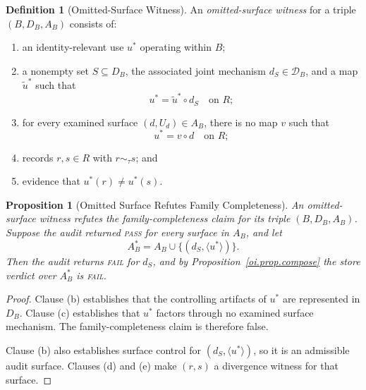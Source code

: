 \documentclass[11pt]{article}
\theoremstyle{plain}
\newtheorem{proposition}[theorem]{Proposition}
\theoremstyle{definition}
\newtheorem{definition}[theorem]{Definition}
\theoremstyle{remark}
\newcommand{\PASS}{\textnormal{\textsc{pass}}}
\newcommand{\FAIL}{\textnormal{\textsc{fail}}}
\begin{document}
\begin{definition}[Omitted-Surface Witness]
  \label{oi.def.omittedsurface}
  An \emph{omitted-surface witness}
  for a triple \((B,D_B,A_B)\)
  consists of:
  \begin{enumerate}[label=(\alph*)]
    \item an identity-relevant use \(u^{\ast}\) operating within \(B\);
    \item a nonempty set \(S\subseteq D_B\),
          the associated joint mechanism
          \(d_S\in\mathcal{D}_B\),
          and a map \(\tilde{u}^{\ast}\) such that
          \[
            u^{\ast}
            =
            \tilde{u}^{\ast}\circ d_S
            \quad\text{on }R;
          \]
    \item for every examined surface
          \((d,U_d)\in A_B\),
          there is no map \(v\) such that
          \[
            u^{\ast}=v\circ d
            \quad\text{on }R;
          \]
    \item records \(r,s\in R\) with
          \(r\sim_{\tau}s\); and
    \item evidence that
          \(u^{\ast}(r)\neq u^{\ast}(s)\).
  \end{enumerate}
\end{definition}

\begin{proposition}[Omitted Surface Refutes Family Completeness]
  \label{oi.prop.refutes-family}
  An omitted-surface witness
  refutes the family-completeness claim
  for its triple \((B,D_B,A_B)\).
  Suppose the audit returned \PASS{}
  for every surface in \(A_B\),
  and let
  \[
    A_B^{\ast}
    =
    A_B\cup\bigl\{(d_S,\langle u^{\ast}\rangle)\bigr\}.
  \]
  Then the audit returns \FAIL{} for \(d_S\),
  and by Proposition~\ref{oi.prop.compose}
  the store verdict over \(A_B^{\ast}\) is \FAIL{}.
\end{proposition}

\begin{proof}
  Clause (b) establishes that the controlling artifacts
  of \(u^{\ast}\) are represented in \(D_B\).
  Clause (c) establishes that
  \(u^{\ast}\) factors through no examined surface mechanism.
  The family-completeness claim is therefore false.

  Clause (b) also establishes surface control for
  \((d_S,\langle u^{\ast}\rangle)\),
  so it is an admissible audit surface.
  Clauses (d) and (e) make \((r,s)\)
  a divergence witness for that surface.
\end{proof}
\end{document}
